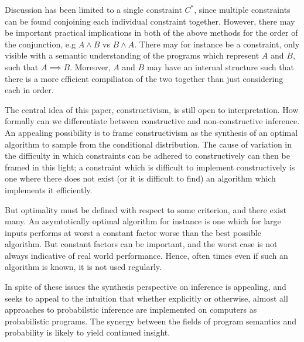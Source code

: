 Discussion has been limited to a single constraint $C^*$, since multiple constraints can be found conjoining each individual constraint together.
However, there may be important practical implications in both of the above methods for the order of the conjunction, e.g $A \land B$ vs $B \land A$.
There may for instance be a constraint, only visible with a semantic understanding of the programs which represent $A$ and $B$, such that $A \implies B$.
Moreover, $A$ and $B$ may have an internal structure such that there is a more efficient compiliaton of the two together than just considering each in order.

The central idea of this paper, constructivism, is still open to interpretation.
How formally can we differentiate between constructive and non-constructive inference.
An appealing possibility is to frame constructivism as the synthesis of an optimal algorithm to sample from the conditional distribution.
The cause of variation in the difficulty in which constraints can be adhered to constructively can then be framed in this light; a constraint which is difficult to implement constructively is one where there does not exist (or it is difficult to find) an algorithm which implements it efficiently.

But optimality must be defined with respect to some criterion, and there exist many.
An asymtotically optimal algorithm for instance is one which for large inputs performs at worst a constant factor worse than the best possible algorithm.
But constant factors can be important, and the worst case is not always indicative of real world performance.
Hence, often times even if such an algorithm is known, it is not used regularly.

In spite of these issues the synthesis perspective on inference is appealing, and seeks to appeal to the intuition that whether explicitly or otherwise, almost all approaches to probabilstic inference are implemented on computers as probabilistic programs.
The synergy between the fields of program semantics and probability is likely to yield continued insight.


